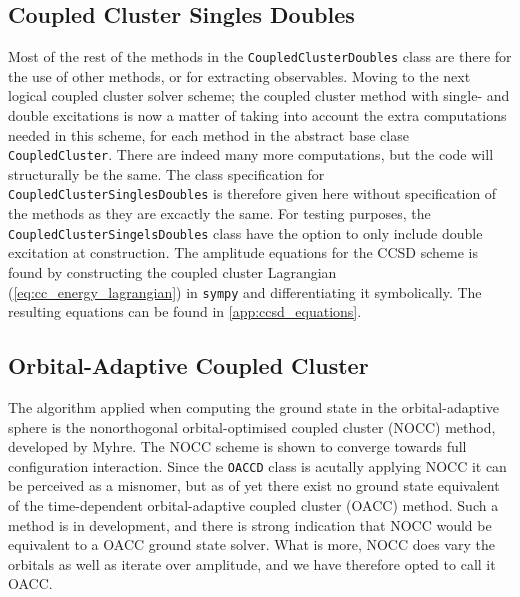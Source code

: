     \subsection{Coupled Cluster Singles Doubles}

    Most of the rest of the methods in the \lstinline{CoupledClusterDoubles} class are there 
    for the use of other methods, or for extracting observables. Moving to the next logical 
    coupled cluster solver scheme; the coupled cluster method with single- and double 
    excitations is now a matter of taking into account the extra computations needed in 
    this scheme, for each method in the abstract base clase \lstinline{CoupledCluster}. 
    There are indeed many more computations, but the code will structurally be the same. 
    The class specification for \lstinline{CoupledClusterSinglesDoubles} is therefore 
    given here without specification of the methods as they are excactly the same. For testing 
    purposes, the \lstinline{CoupledClusterSingelsDoubles} class have the option 
    to only include double excitation at construction. The amplitude equations for 
    the CCSD scheme is found by constructing the coupled cluster Lagrangian
    (\autoref{eq:cc_energy_lagrangian}) in \lstinline{sympy} and differentiating 
    it symbolically. The resulting equations can be found in \autoref{app:ccsd_equations}.

    

    \subsection{Orbital-Adaptive Coupled Cluster}

    The algorithm applied when computing the ground state in the orbital-adaptive sphere 
    is the nonorthogonal orbital-optimised coupled cluster (NOCC) method, developed by 
    Myhre\cite{myhre2018demonstrating}. The NOCC scheme is shown to converge towards full
    configuration interaction. Since the \lstinline{OACCD} class is acutally applying 
    NOCC it can be perceived as a misnomer, but as of yet there exist no ground state 
    equivalent of the time-dependent 
    orbital-adaptive coupled cluster (OACC) method. Such a method is in development, and there
    is strong indication that NOCC would be equivalent to a OACC ground state solver. What is 
    more, NOCC does vary the orbitals as well as iterate over amplitude, and we have therefore 
    opted to call it OACC.

    


